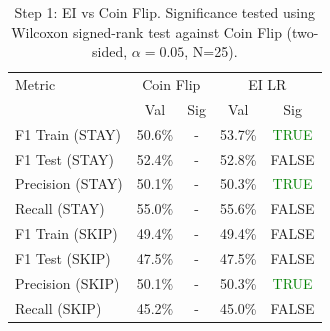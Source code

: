 \begin{table}[ht]
\centering
\begin{tabular}{lcccc}
\hline
Metric & \multicolumn{2}{c}{Coin Flip} & \multicolumn{2}{c}{EI LR} \\
 & Val & Sig & Val & Sig \\
\hline
F1 Train (STAY) & 50.6\% & - & 53.7\% & \textcolor{green}{TRUE} \\
F1 Test (STAY) & 52.4\% & - & 52.8\% & FALSE \\
Precision (STAY) & 50.1\% & - & 50.3\% & \textcolor{green}{TRUE} \\
Recall (STAY) & 55.0\% & - & 55.6\% & FALSE \\
F1 Train (SKIP) & 49.4\% & - & 49.4\% & FALSE \\
F1 Test (SKIP) & 47.5\% & - & 47.5\% & FALSE \\
Precision (SKIP) & 50.1\% & - & 50.3\% & \textcolor{green}{TRUE} \\
Recall (SKIP) & 45.2\% & - & 45.0\% & FALSE \\
\hline
\end{tabular}
\caption{Step 1: EI vs Coin Flip. Significance tested using Wilcoxon signed-rank test against Coin Flip (two-sided, $\alpha=0.05$, N=25).}
\label{tab:metrics_1_intra}
\end{table}